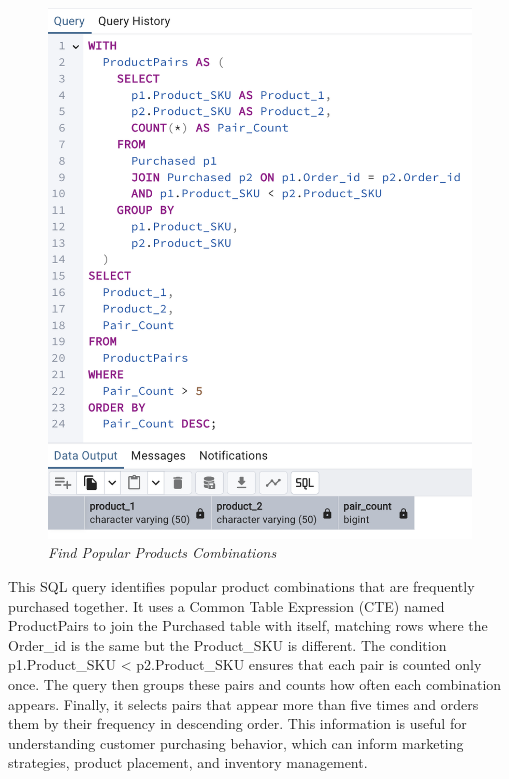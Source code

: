 


\begin{figure}[H]
  \centering
  \includegraphics[width=1\textwidth]{images/sql/complex-queries/find_popular_products_combinations.png}
  \caption{\textit{Find Popular Products Combinations}}
\end{figure}

This SQL query identifies popular product combinations that are frequently purchased together. It uses a Common Table Expression (CTE) named ProductPairs to join the Purchased table with itself, matching rows where the Order\_id is the same but the Product\_SKU is different. The condition p1.Product\_SKU < p2.Product\_SKU ensures that each pair is counted only once. The query then groups these pairs and counts how often each combination appears. Finally, it selects pairs that appear more than five times and orders them by their frequency in descending order. This information is useful for understanding customer purchasing behavior, which can inform marketing strategies, product placement, and inventory management.

